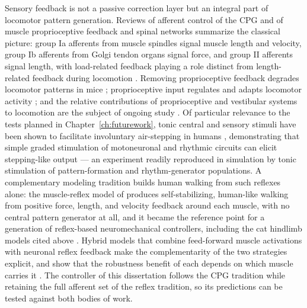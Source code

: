 Sensory feedback is not a passive correction layer but an integral part of locomotor pattern generation. Reviews of afferent control of the CPG \citep{van_de_crommert_review_1998} and of muscle proprioceptive feedback and spinal networks \citep{windhorst_muscle_2007, windhorst_spinal_2022} summarize the classical picture: group Ia afferents from muscle spindles signal muscle length and velocity, group Ib afferents from Golgi tendon organs signal force, and group II afferents signal length, with load-related feedback playing a role distinct from length-related feedback during locomotion \citep{dietz_significance_2000}. Removing proprioceptive feedback degrades locomotor patterns in mice \citep{akay_degradation_2014}; proprioceptive input regulates and adapts locomotor activity \citep{lam_role_2002}; and the relative contributions of proprioceptive and vestibular systems to locomotion are the subject of ongoing study \citep{akay_relative_2021, akay_sensory_2020}. Of particular relevance to the tests planned in Chapter~\ref{ch:futurework}, tonic central and sensory stimuli have been shown to facilitate involuntary air-stepping in humans \citep{selionov_tonic_2009}, demonstrating that simple graded stimulation of motoneuronal and rhythmic circuits can elicit stepping-like output --- an experiment readily reproduced in simulation by tonic stimulation of pattern-formation and rhythm-generator populations. A complementary modeling tradition builds human walking from such reflexes alone: the muscle-reflex model of \citet{geyer_musclereflex_2010} produces self-stabilizing, human-like walking from positive force, length, and velocity feedback around each muscle, with no central pattern generator at all, and it became the reference point for a generation of reflex-based neuromechanical controllers, including the cat hindlimb models cited above \citep{markin_afferent_2010, shevtsova_modeling_2016}. Hybrid models that combine feed-forward muscle activations with neuronal reflex feedback make the complementarity of the two strategies explicit, and show that the robustness benefit of each depends on which muscle carries it \citep{haeufle_benefit_2018}. The controller of this dissertation follows the CPG tradition while retaining the full afferent set of the reflex tradition, so its predictions can be tested against both bodies of work.

